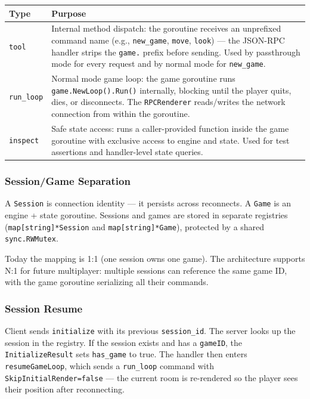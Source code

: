 \documentclass[a4paper,10pt]{article}
\newcommand{\field}[1]{\texttt{#1}}
\begin{document}
\begin{center}
\begin{tabular}{lp{8cm}}
\toprule
\textbf{Type} & \textbf{Purpose} \\
\midrule
\texttt{tool}
  & Internal method dispatch: the goroutine receives an unprefixed
    command name (e.g., \texttt{new\_game}, \texttt{move},
    \texttt{look}) --- the JSON-RPC handler strips the \texttt{game.}
    prefix before sending.  Used by passthrough mode for every
    request and by normal mode for \texttt{new\_game}. \\
\texttt{run\_loop}
  & Normal mode game loop: the game goroutine runs
    \texttt{game.NewLoop().Run()} internally, blocking until the
    player quits, dies, or disconnects.  The \texttt{RPCRenderer}
    reads/writes the network connection from within the goroutine. \\
\texttt{inspect}
  & Safe state access: runs a caller-provided function inside the
    game goroutine with exclusive access to engine and state.
    Used for test assertions and handler-level state queries. \\
\bottomrule
\end{tabular}
\end{center}

\subsubsection{Session/Game Separation}

A \texttt{Session} is connection identity --- it persists across
reconnects.  A \texttt{Game} is an engine + state goroutine.
Sessions and games are stored in separate registries
(\texttt{map[string]*Session} and \texttt{map[string]*Game}),
protected by a shared \texttt{sync.RWMutex}.

Today the mapping is 1:1 (one session owns one game).  The
architecture supports N:1 for future multiplayer: multiple sessions
can reference the same game ID, with the game goroutine serializing
all their commands.

\subsubsection{Session Resume}

Client sends \texttt{initialize} with its previous
\field{session\_id}.  The server looks up the session in the
registry.  If the session exists and has a \field{gameID}, the
\texttt{InitializeResult} sets \field{has\_game} to true.  The
handler then enters \texttt{resumeGameLoop}, which sends a
\texttt{run\_loop} command with \texttt{SkipInitialRender=false}
--- the current room is re-rendered so the player sees their
position after reconnecting.
\end{document}
